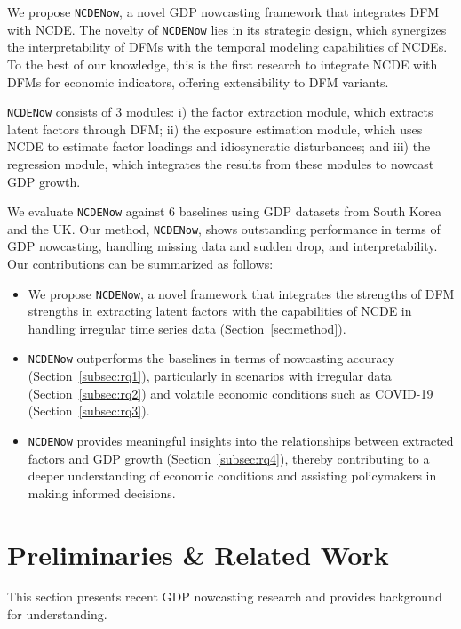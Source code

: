 \documentclass[sigconf]{acmart}
\begin{document}
We propose \texttt{NCDENow}, a novel GDP nowcasting framework that integrates DFM with NCDE. The novelty of \texttt{NCDENow} lies in its strategic design, which synergizes the interpretability of DFMs with the temporal modeling capabilities of NCDEs. 
To the best of our knowledge, this is the first research to integrate NCDE with DFMs for economic indicators, offering extensibility to DFM variants.

\texttt{NCDENow} consists of 3 modules: i) the factor extraction module, which extracts latent factors through DFM; ii) the exposure estimation module, which uses NCDE to estimate factor loadings and idiosyncratic disturbances; and iii) the regression module, which integrates the results from these modules to nowcast GDP growth.

We evaluate \texttt{NCDENow} against 6 baselines using GDP datasets from South Korea and the UK. Our method, \texttt{NCDENow}, shows outstanding performance in terms of GDP nowcasting, handling missing data and sudden drop, and interpretability. Our contributions can be summarized as follows:
\begin{itemize}
    \item We propose \texttt{NCDENow}, a novel framework that integrates the strengths of DFM strengths in extracting latent factors with the capabilities of NCDE in handling irregular time series data (Section~\ref{sec:method}).
    \item \texttt{NCDENow} outperforms the baselines in terms of nowcasting accuracy (Section~\ref{subsec:rq1}), particularly in scenarios with irregular data (Section~\ref{subsec:rq2}) and volatile economic conditions such as COVID-19 (Section~\ref{subsec:rq3}).
    \item \texttt{NCDENow} provides meaningful insights into the relationships between extracted factors and GDP growth (Section~\ref{subsec:rq4}), thereby contributing to a deeper understanding of economic conditions and assisting policymakers in making informed decisions.
\end{itemize}


\section{Preliminaries \& Related Work}
This section presents recent GDP nowcasting research and provides background for understanding.
\end{document}
